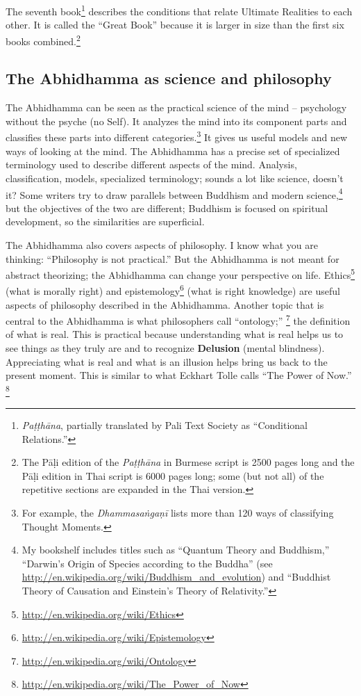 The seventh book\footnote{\textit{Paṭṭhāna}, partially translated by Pali Text Society as “Conditional Relations.”} describes the conditions that relate Ultimate Realities to each other. It is called the “Great Book” because it is larger in size than the first six books combined.\footnote{The Pāḷi edition of the \textit{Paṭṭhāna} in Burmese script is 2500 pages long and the Pāḷi edition in Thai script is 6000 pages long; some (but not all) of the repetitive sections are expanded in the Thai version.}

\subsection*{The Abhidhamma as science and philosophy}

The Abhidhamma can be seen as the practical science of the mind – psychology without the psyche (no Self). It analyzes the mind into its component parts and classifies these parts into different categories.\footnote{For example, the \textit{Dhammasaṅgaṇī} lists more than 120 ways of classifying Thought Moments.} It gives us useful models and new ways of looking at the mind. The Abhidhamma has a precise set of specialized terminology used to describe different aspects of the mind. Analysis, classification, models, specialized terminology; sounds a lot like science, doesn’t it? Some writers try to draw parallels between Buddhism and modern science,\footnote{My bookshelf includes titles such as “Quantum Theory and Buddhism,” “Darwin’s Origin of Species according to the Buddha” (see \url{http://en.wikipedia.org/wiki/Buddhism_and_evolution}) and “Buddhist Theory of Causation and Einstein’s Theory of Relativity.”} but the objectives of the two are different; Buddhism is focused on spiritual development, so the similarities are superficial.

The Abhidhamma also covers aspects of philosophy. I know what you are thinking: “Philosophy is not practical.” But the Abhidhamma is not meant for abstract theorizing; the Abhidhamma can change your perspective on life. Ethics\footnote{\url{http://en.wikipedia.org/wiki/Ethics}} (what is morally right) and epistemology\footnote{\url{http://en.wikipedia.org/wiki/Epistemology}} (what is right knowledge) are useful aspects of philosophy described in the Abhidhamma. Another topic that is central to the Abhidhamma is what philosophers call “ontology;” \footnote{\url{http://en.wikipedia.org/wiki/Ontology}} the definition of what is real. This is practical because understanding what is real helps us to see things as they truly are and to recognize \textbf{Delusion} (mental blindness). Appreciating what is real and what is an illusion helps bring us back to the present moment. This is similar to what Eckhart Tolle calls “The Power of Now.” \footnote{\url{http://en.wikipedia.org/wiki/The_Power_of_Now}}

